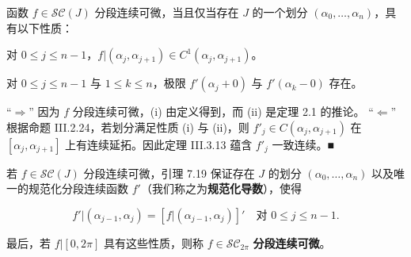\begin{lemma}

函数 $ f \in \mathcal{SC}(J) $ 分段连续可微，当且仅当存在 $ J $ 的一个划分 $ (\alpha_{0}, \ldots, \alpha_{n}) $，具有以下性质：

\begin{subitems}
\item

对 $ 0 \le j \le n-1 $，$ f|(\alpha_{j}, \alpha_{j+1}) \in C^{1}(\alpha_{j}, \alpha_{j+1}) $。

\item

对 $ 0 \le j \le n-1 $ 与 $ 1 \le k \le n $，极限 $ f'(\alpha_{j} + 0) $ 与 $ f'(\alpha_{k} - 0) $ 存在。

\proofhead
“$ \Longrightarrow $” 因为 $ f $ 分段连续可微，(i) 由定义得到，而 (ii) 是定理 2.1 的推论。
“$ \Longleftarrow $” 根据命题 III.2.24，若划分满足性质 (i) 与 (ii)，则 $ f'_{j} \in C(\alpha_{j}, \alpha_{j+1}) $ 在 $ [\alpha_{j}, \alpha_{j+1}] $ 上有连续延拓。因此定理 III.3.13 蕴含 $ f'_{j} $ 一致连续。\nobreak\hspace{0.35em}■
\end{subitems}

\end{lemma}


若 $ f \in \mathcal{SC}(J) $ 分段连续可微，引理 7.19 保证存在 $ J $ 的划分 $ (\alpha_{0}, \ldots, \alpha_{n}) $ 以及唯一的规范化分段连续函数 $ f' $（我们称之为\textbf{规范化导数}），使得

\[
f'|(\alpha_{j-1}, \alpha_{j}) = [f|(\alpha_{j-1}, \alpha_{j})]' \quad \text{对 } 0 \le j \le n-1 .
\]

最后，若 $ f|[0, 2\pi] $ 具有这些性质，则称 $ f \in \mathcal{SC}_{2\pi} $ \textbf{分段连续可微}。

